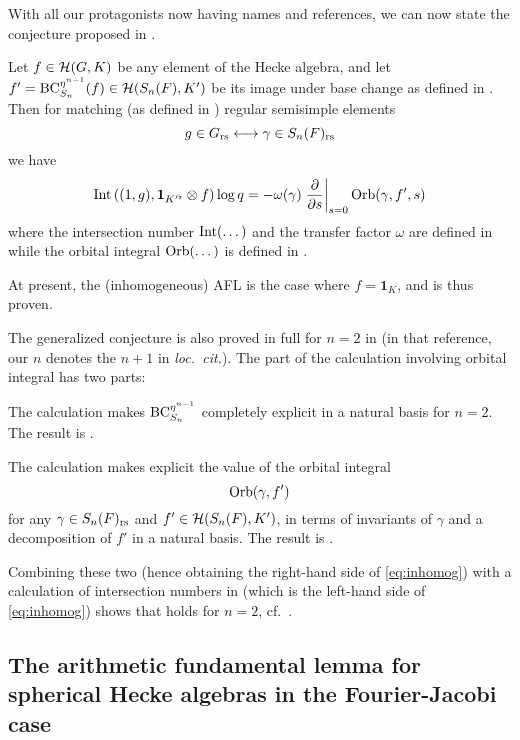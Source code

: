 With all our protagonists now having names and references,
we can now state the conjecture proposed in \cite{ref:AFLspherical}.
\begin{conjecture}
  \label{conj:inhomog}
  Let $f \in \mathcal H(G, K)$ be any element of the Hecke algebra,
  and let $f' = \operatorname{BC}_{S_n}^{\eta^{n-1}}(f) \in \mathcal H(S_n(F), K')$ be its image
  under base change as defined in .
  Then for matching (as defined in ) regular semisimple elements
  \[ g \in G_{\mathrm{rs}} \longleftrightarrow \gamma \in S_n(F)_{\mathrm{rs}} \]
  we have
  \begin{equation}
    \operatorname{Int}\left( (1,g), \mathbf{1}_{K'^\flat} \otimes f \right) \log q
    = -\omega(\gamma) \left. \pdv{}{s} \right\rvert_{s=0} \operatorname{Orb}(\gamma, f', s)
    \label{eq:inhomog}
  \end{equation}
  where the intersection number $\operatorname{Int}(\dots)$ and
  the transfer factor $\omega$ are defined in 
  while the orbital integral $\operatorname{Orb}(\dots)$ is defined in .
\end{conjecture}

At present, the (inhomogeneous) AFL is the case where $f = \mathbf{1}_K$,
and is thus proven.

The generalized conjecture is also proved in full for
$n = 2$ in \cite[Theorem 1.0.1]{ref:AFLspherical}
(in that reference, our $n$ denotes the $n+1$ in \emph{loc.\ cit.}).
The part of the calculation involving orbital integral has two parts:
\begin{itemize}
  \ii The calculation makes $\operatorname{BC}_{S_{n}}^{\eta^{n-1}}$
  completely explicit in a natural basis for $n = 2$.
  The result is \cite[Lemma 7.1.1]{ref:AFLspherical}.

  \ii The calculation makes explicit the value of the orbital integral
  \[ \operatorname{Orb}(\gamma, f') \]
  for any $\gamma \in S_n(F)_{\mathrm{rs}}$ and $f' \in \mathcal H(S_n(F), K')$,
  in terms of invariants of $\gamma$ and a decomposition of $f'$ in a natural basis.
  The result is \cite[Proposition 7.3.2]{ref:AFLspherical}.
\end{itemize}
Combining these two (hence obtaining the right-hand side of \eqref{eq:inhomog})
with a calculation of intersection numbers in \cite[Corollary 7.4.3]{ref:AFLspherical}
(which is the left-hand side of \eqref{eq:inhomog})
shows that  holds for $n = 2$,
cf.\ \cite[Theorem 7.5.1]{ref:AFLspherical}.

\subsection{The arithmetic fundamental lemma for spherical Hecke algebras
  in the Fourier-Jacobi case}

